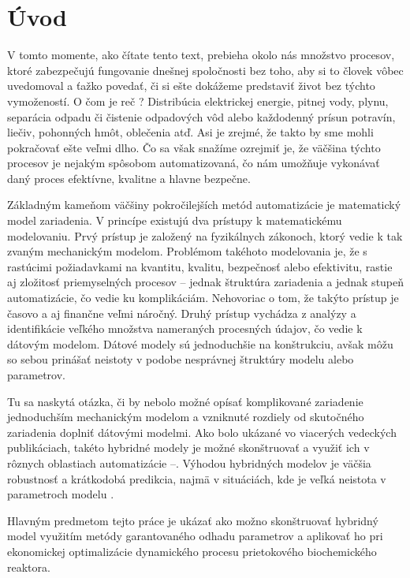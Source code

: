\chapter*{Úvod}
V tomto momente, ako čítate tento text, prebieha okolo nás množstvo procesov, ktoré zabezpečujú fungovanie dnešnej spoločnosti bez toho, aby si to človek vôbec uvedomoval a ťažko povedať, či si ešte dokážeme predstaviť život bez týchto vymožeností. O čom je reč ? Distribúcia elektrickej energie, pitnej vody, plynu, separácia odpadu či čistenie odpadových vôd alebo každodenný prísun potravín, liečiv, pohonných hmôt, oblečenia atď. Asi je zrejmé, že takto by sme mohli pokračovať ešte veľmi dlho. Čo sa však snažíme ozrejmiť je, že väčšina týchto procesov je nejakým spôsobom automatizovaná, čo nám umožňuje vykonávať daný proces efektívne, kvalitne a hlavne bezpečne. 

Základným kameňom väčšiny pokročilejších metód automatizácie je matematický model zariadenia. V princípe existujú dva prístupy k matematickému modelovaniu. Prvý prístup je založený na fyzikálnych zákonoch, ktorý vedie k tak zvaným mechanickým modelom. Problémom takéhoto modelovania je, že s rastúcimi požiadavkami na kvantitu, kvalitu, bezpečnosť alebo efektivitu, rastie aj zložitosť priemyselných procesov -- jednak štruktúra zariadenia a jednak stupeň automatizácie, čo vedie ku komplikáciám. Nehovoriac o tom, že takýto prístup je časovo a aj finančne veľmi náročný. Druhý prístup vychádza z analýzy a identifikácie veľkého množstva nameraných procesných údajov, čo vedie k dátovým modelom. Dátové modely sú jednoduchšie na konštrukciu, avšak môžu so sebou prinášať neistoty v podobe nesprávnej štruktúry modelu alebo parametrov.

Tu sa naskytá otázka, či by nebolo možné opísať komplikované zariadenie jednoduchším mechanickým modelom a vzniknuté rozdiely od skutočného zariadenia doplniť dátovými modelmi. Ako bolo ukázané vo viacerých vedeckých publikáciach, takéto hybridné modely je možné skonštruovať a využiť ich v rôznych oblastiach automatizácie \cite{hamilton:hybrid_modeling:2017}--\cite{hernandez:economics_opt_w_mismatch:2019}. Výhodou hybridných modelov je väčšia robustnosť a krátkodobá predikcia, najmä v situáciách, kde je veľká neistota v parametroch modelu \cite{hamilton:hybrid_modeling:2017}.

Hlavným predmetom tejto práce je ukázať ako možno skonštruovať hybridný model využitím metódy garantovaného odhadu parametrov a aplikovať ho pri ekonomickej optimalizácie dynamického procesu prietokového biochemického reaktora.
